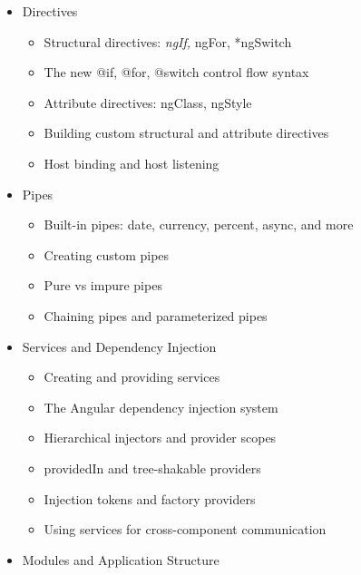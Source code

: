 \documentclass[
]{article}
\providecommand{\tightlist}{%
  \setlength{\itemsep}{0pt}\setlength{\parskip}{0pt}}
\begin{document}
\begin{itemize}
  \begin{itemize}
  \tightlist
  \item
    Interpolation binding
  \item
    Property binding and attribute binding
  \item
    Event binding and event handling
  \item
    Two-way binding with ngModel
  \item
    Binding best practices and change detection strategy
  \end{itemize}
\item
  Directives

  \begin{itemize}
  \tightlist
  \item
    Structural directives: \emph{ngIf, }ngFor, *ngSwitch
  \item
    The new @if, @for, @switch control flow syntax
  \item
    Attribute directives: ngClass, ngStyle
  \item
    Building custom structural and attribute directives
  \item
    Host binding and host listening
  \end{itemize}
\item
  Pipes

  \begin{itemize}
  \tightlist
  \item
    Built-in pipes: date, currency, percent, async, and more
  \item
    Creating custom pipes
  \item
    Pure vs impure pipes
  \item
    Chaining pipes and parameterized pipes
  \end{itemize}
\item
  Services and Dependency Injection

  \begin{itemize}
  \tightlist
  \item
    Creating and providing services
  \item
    The Angular dependency injection system
  \item
    Hierarchical injectors and provider scopes
  \item
    providedIn and tree-shakable providers
  \item
    Injection tokens and factory providers
  \item
    Using services for cross-component communication
  \end{itemize}
\item
  Modules and Application Structure


\end{itemize}
\end{document}
